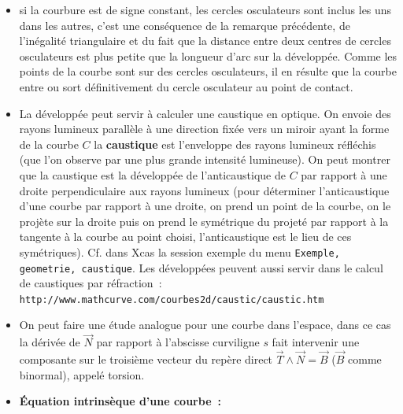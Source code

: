 \documentclass[a4paper,11pt]{article}
\begin{document}
\begin{giacjshere}
\begin{itemize}
la longueur d'arc de courbe de la d\'evelopp\'ee est donn\'ee par~:
$$ \int_{t_0}^{t_1} \left|\frac{d\frac{1}{\kappa}}{dt}\right| \ dt = 
\left| \left[\frac{1}{\kappa}\right]_{t_0}^{t_1} \right|
= |R(t_1)-R(t_0)|
$$
\\
Cons\'equence~: si on enroule un fil sur la d\'evelopp\'ee $D$,
que ce fil est tendu et que son extr\'emit\'e co\"incide, avant de
commencer \`a le d\'erouler, avec un point de la courbe $C$ 
alors dans la suite du d\'eroul\'e, l’extr\'emit\'e parcoura la courbe
$C$ (on dit que $C$ est une d\'eveloppante de $D$).
\item si la courbure est de signe constant, les cercles osculateurs
sont inclus les uns dans les autres, c'est une cons\'equence
de la remarque pr\'ec\'edente, de l'in\'egalit\'e triangulaire
et du fait que la distance entre deux centres de cercles
osculateurs est plus petite que la longueur d'arc sur la
d\'evelopp\'ee. Comme les points de la courbe sont
sur des cercles osculateurs, il en r\'esulte que la courbe
entre ou sort d\'efinitivement du cercle osculateur au point
de contact.
\item La d\'evelopp\'ee peut servir \`a calculer une caustique en
optique. On envoie des rayons lumineux parall\`ele \`a une
direction fix\'ee vers un miroir ayant la forme de la courbe $C$
la {\bf caustique} 
est l'enveloppe des rayons lumineux r\'efl\'echis
(que l'on observe par une plus grande intensit\'e lumineuse).
On peut montrer que la caustique est la d\'evelopp\'ee 
de l'anticaustique de $C$ par rapport \`a une droite perpendiculaire
aux rayons lumineux (pour d\'eterminer 
l'anticaustique d'une courbe par rapport
\`a une droite, on prend un point de la courbe, on le proj\`ete sur
la droite puis on prend le sym\'etrique du projet\'e par rapport \`a la
tangente \`a la courbe au point choisi, 
l'anticaustique est le lieu de ces sym\'etriques). 
Cf. dans Xcas la session exemple du
menu \verb|Exemple, geometrie, caustique|.
Les d\'evelopp\'ees peuvent aussi servir dans le calcul de caustiques
par r\'efraction~:
\verb|http://www.mathcurve.com/courbes2d/caustic/caustic.htm|
\item On peut faire une \'etude analogue pour une courbe dans
  l'espace, dans ce cas la d\'eriv\'ee de $\vec{N}$
par rapport \`a l'abscisse curviligne $s$ fait intervenir une
composante sur le troisi\`eme vecteur du rep\`ere direct
$\vec{T} \wedge\vec{N}=\vec{B}$ 
($\vec{B}$ comme binormal), appel\'e
torsion.
\item {\bf \'Equation intrins\`eque d'une courbe~:}\\

\end{itemize}
\end{giacjshere}
\end{document}
